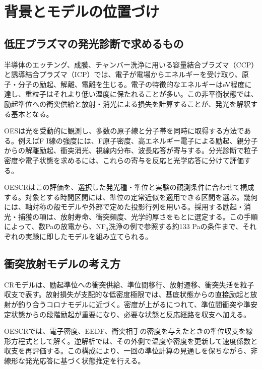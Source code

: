 \section{背景とモデルの位置づけ}
\subsection{低圧プラズマの発光診断で求めるもの}
半導体のエッチング、成膜、チャンバー洗浄に用いる容量結合プラズマ（CCP）と誘導結合プラズマ（ICP）では、電子が電場からエネルギーを受け取り、原子・分子の励起、解離、電離を生じる。電子の特徴的なエネルギーはeV程度に達し、重粒子はそれより低い温度に保たれることが多い。この非平衡状態では、励起準位への衝突供給と放射・消光による損失を計算することが、発光を解釈する基本となる\cite{fujimoto,lieberman}。

OESは光を受動的に観測し、多数の原子線と分子帯を同時に取得する方法である。例えばF I線の強度には、F原子密度、高エネルギー電子による励起、親分子からの解離励起、衝突消光、視線内分布、波長応答が寄与する。分光診断で粒子密度や電子状態を求めるには、これらの寄与を反応と光学応答に分けて評価する\cite{coburn,fuller}。

OESCRはこの評価を、選択した発光種・準位と実験の観測条件に合わせて構成する。対象とする時間区間には、準位の定常近似を適用できる区間を選ぶ。幾何には、軸対称の殻モデルや外部で定めた投影行列を用いる。採用する励起・消光・捕獲の項は、放射寿命、衝突頻度、光学的厚さをもとに選定する。この手順によって、数Paの放電から、NF$_3$洗浄の例で参照する約133 Paの条件まで、それぞれの実験に即したモデルを組み立てられる\cite{an2023}。

\subsection{衝突放射モデルの考え方}
CRモデルは、励起準位への衝突供給、準位間移行、放射遷移、衝突失活を粒子収支で表す。放射損失が支配的な低密度極限では、基底状態からの直接励起と放射が釣り合うコロナモデルに近づく。密度が上がるにつれて、準位間衝突や準安定状態からの段階励起が重要になり、必要な状態と反応経路を収支へ加える\cite{fujimoto}。

OESCRでは、電子密度、EEDF、衝突相手の密度を与えたときの準位収支を線形方程式として解く。逆解析では、その外側で温度や密度を更新して速度係数と収支を再評価する。この構成により、一回の準位計算の見通しを保ちながら、非線形な発光応答に基づく状態推定を行える。


